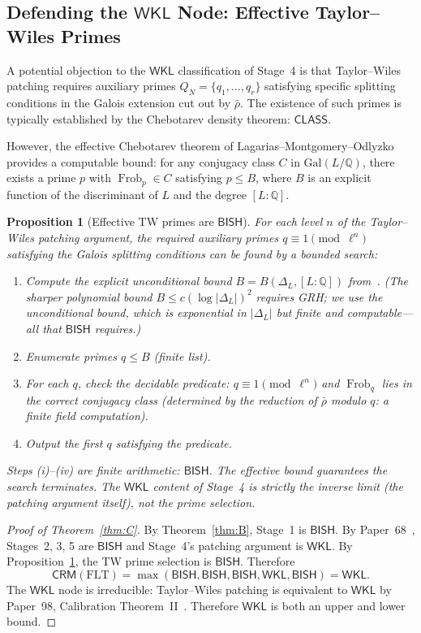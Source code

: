\documentclass[11pt,a4paper]{article}
\theoremstyle{plain}
\newtheorem{proposition}[theorem]{Proposition}
\theoremstyle{definition}
\newcommand{\BISH}{\textsf{BISH}}
\newcommand{\WKL}{\textsf{WKL}}
\newcommand{\CLASS}{\textsf{CLASS}}
\newcommand{\CRM}{\textsf{CRM}}
\newcommand{\Q}{\mathbb{Q}}
\newcommand{\Gal}{\mathrm{Gal}}
\DeclareMathOperator{\Frob}{Frob}
\begin{document}
\subsection{Defending the $\WKL$ Node: Effective Taylor--Wiles Primes}

A potential objection to the $\WKL$ classification of Stage~4 is that Taylor--Wiles patching requires auxiliary primes $Q_N = \{q_1, \ldots, q_r\}$ satisfying specific splitting conditions in the Galois extension cut out by $\bar{\rho}$.
The existence of such primes is typically established by the Chebotarev density theorem: $\CLASS$.

However, the effective Chebotarev theorem of Lagarias--Montgomery--Odlyzko~\cite{lagarias-odlyzko77} provides a computable bound: for any conjugacy class $C$ in $\Gal(L/\Q)$, there exists a prime $p$ with $\Frob_p \in C$ satisfying $p \leq B$, where $B$ is an explicit function of the discriminant of $L$ and the degree $[L:\Q]$.

\begin{proposition}[Effective TW primes are $\BISH$]\label{prop:effective-tw}
For each level $n$ of the Taylor--Wiles patching argument, the required auxiliary primes $q \equiv 1 \pmod{\ell^n}$ satisfying the Galois splitting conditions can be found by a bounded search:
\begin{enumerate}[label=(\roman*)]
\item Compute the explicit \emph{unconditional} bound $B = B(\Delta_L, [L:\Q])$ from~\cite{lagarias-odlyzko77}. (The sharper polynomial bound $B \leq c(\log|\Delta_L|)^2$ requires GRH; we use the unconditional bound, which is exponential in $|\Delta_L|$ but finite and computable---all that $\BISH$ requires.)
\item Enumerate primes $q \leq B$ (finite list).
\item For each $q$, check the decidable predicate: $q \equiv 1 \pmod{\ell^n}$ and $\Frob_q$ lies in the correct conjugacy class (determined by the reduction of $\bar{\rho}$ modulo $q$: a finite field computation).
\item Output the first $q$ satisfying the predicate.
\end{enumerate}
Steps (i)--(iv) are finite arithmetic: $\BISH$.
The effective bound guarantees the search terminates.
The $\WKL$ content of Stage~4 is strictly the inverse limit (the patching argument itself), not the prime selection.
\end{proposition}

\begin{proof}[Proof of Theorem~\ref{thm:C}]
By Theorem~\ref{thm:B}, Stage~1 is $\BISH$. By Paper~68~\cite{lee-p68}, Stages~2, 3, 5 are $\BISH$ and Stage~4's patching argument is $\WKL$. By Proposition~\ref{prop:effective-tw}, the TW prime selection is $\BISH$. Therefore
\[
\CRM(\mathrm{FLT}) = \max(\BISH, \BISH, \BISH, \WKL, \BISH) = \WKL.
\]
The $\WKL$ node is irreducible: Taylor--Wiles patching is equivalent to $\WKL$ by Paper~98, Calibration Theorem~II~\cite{lee-p98}. Therefore $\WKL$ is both an upper and lower bound.
\end{proof}
\end{document}
